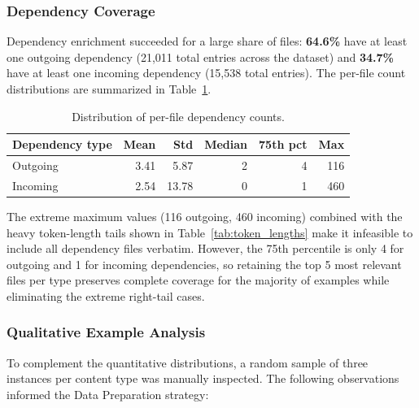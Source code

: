 \documentclass[11pt]{article}
\begin{document}
\subsubsection*{Dependency Coverage}

Dependency enrichment succeeded for a large share of files: \textbf{64.6\%} have at least one outgoing dependency (21,011 total entries across the dataset) and \textbf{34.7\%} have at least one incoming dependency (15,538 total entries). The per-file count distributions are summarized in Table~\ref{tab:dep_stats}.

\begin{table}[H]
\centering
\caption{Distribution of per-file dependency counts.}
\label{tab:dep_stats}
\begin{tabular}{@{}lrrrrr@{}}
\toprule
\textbf{Dependency type} & \textbf{Mean} & \textbf{Std} & \textbf{Median} & \textbf{75th pct} & \textbf{Max} \\ \midrule
Outgoing & 3.41 & 5.87 & 2 & 4 & 116 \\
Incoming & 2.54 & 13.78 & 0 & 1 & 460 \\ \bottomrule
\end{tabular}
\end{table}

The extreme maximum values (116 outgoing, 460 incoming) combined with the heavy token-length tails shown in Table~\ref{tab:token_lengths} make it infeasible to include all dependency files verbatim. However, the 75th percentile is only 4 for outgoing and 1 for incoming dependencies, so retaining the top 5 most relevant files per type preserves complete coverage for the majority of examples while eliminating the extreme right-tail cases.

\subsubsection*{Qualitative Example Analysis}

To complement the quantitative distributions, a random sample of three instances per content type was manually inspected. The following observations informed the Data Preparation strategy:
\end{document}
